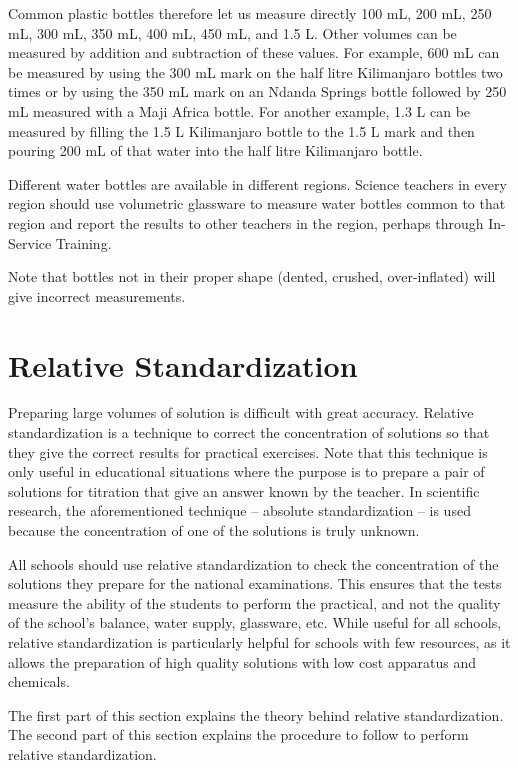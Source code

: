 Common plastic bottles therefore let us measure directly 100 mL, 200 mL, 250 mL, 300 mL, 350 mL, 400 mL, 450 mL, and 1.5 L. Other volumes can be measured by addition and subtraction of these values. For example, 600 mL can be measured by using the 300 mL mark on the half litre Kilimanjaro bottles two times or by using the 350 mL mark on an Ndanda Springs bottle followed by 250 mL measured with a Maji Africa bottle. For another example, 1.3 L can be measured by filling the 1.5 L Kilimanjaro bottle to the 1.5 L mark and then pouring 200 mL of that water into the half litre Kilimanjaro bottle.

Different water bottles are available in different regions. Science teachers in every region should use volumetric glassware to measure water bottles common to that region and report the results to other teachers in the region, perhaps through In-Service Training.

Note that bottles not in their proper shape (dented, crushed, over-inflated) will give incorrect measurements.

\section{Relative Standardization}

Preparing large volumes of solution is difficult with great accuracy. Relative standardization is a technique to correct the concentration of solutions so that they give the correct results for practical exercises. Note that this technique is only useful in educational situations where the purpose is to prepare a pair of solutions for titration that give an answer known by the teacher. In scientific research, the aforementioned technique -- absolute standardization -- is used because the concentration of one of the solutions is truly unknown.

All schools should use relative standardization to check the concentration of the solutions they prepare for the national examinations. This ensures that the tests measure the ability of the students to perform the practical, and not the quality of the school's balance, water supply, glassware, etc. While useful for all schools, relative standardization is particularly helpful for schools with few resources, as it allows the preparation of high quality solutions with low cost apparatus and chemicals.

The first part of this section explains the theory behind relative standardization. The second part of this section explains the procedure to follow to perform relative standardization.

